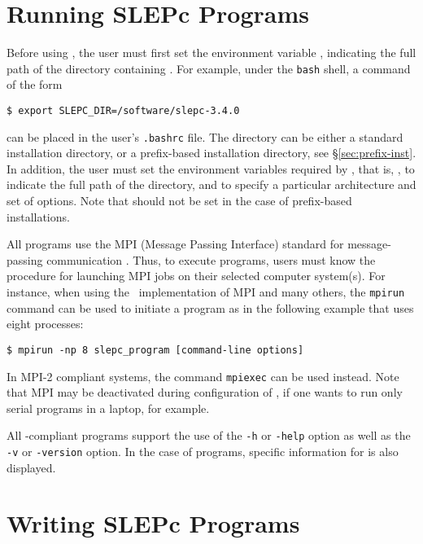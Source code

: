 \section{Running SLEPc Programs}

Before using \slepc, the user must first set the environment variable
, indicating the full path of the directory containing \slepc. For example, under the \texttt{bash} shell, a command of the form
	\begin{Verbatim}[fontsize=\small]
	$ export SLEPC_DIR=/software/slepc-3.4.0
	\end{Verbatim}
can be placed in the user's \Verb!.bashrc! file.
The  directory can be either a standard installation \slepc directory, or a prefix-based installation directory, see \S\ref{sec:prefix-inst}.
In addition, the user must set the environment variables required by \petsc, that is, , to indicate the full path of the \petsc directory, and  to specify a particular architecture and set of options. Note that  should not be set in the case of prefix-based installations.

All \petsc programs use the MPI (Message Passing Interface) standard
for message-passing communication \citep{MPI-Forum:1994:MMI}.  Thus, to execute
\slepc programs, users must know the procedure for launching MPI jobs
on their selected computer system(s).  For instance, when using the
\mpich\ implementation of MPI and many others, the \texttt{mpirun} command can be used to initiate a program as in the following example that uses eight processes:
	\begin{Verbatim}[fontsize=\small]
	$ mpirun -np 8 slepc_program [command-line options]
	\end{Verbatim}
In MPI-2 compliant systems, the command \texttt{mpiexec} can be used instead. Note that MPI may be deactivated during configuration of \petsc, if one wants to run only serial programs in a laptop, for example.

All \petsc-compliant programs support the use of the \Verb!-h!
or \Verb!-help! option as well as the \Verb!-v! or \Verb!-version! option. In the case of \slepc programs, specific information for \slepc is also displayed.

\section{Writing SLEPc Programs}

